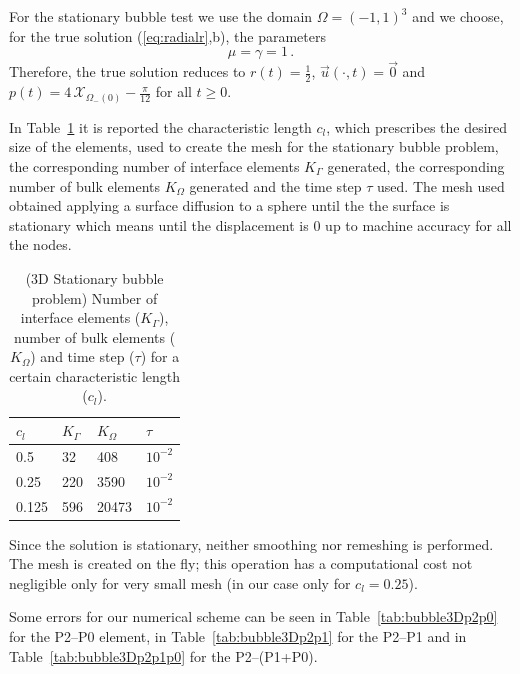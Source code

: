 \documentclass[a4paper,12pt,onecolumn]{article}
\newcommand{\bigchi}{\ensuremath{\mathrm{\mathcal{X}}}}
\newcommand{\charfcn}[1]{\bigchi_{#1}} %
\begin{document}
For the stationary bubble test we use the domain $\Omega = (-1,1)^3$ and we choose, for the true solution (\ref{eq:radialr},b), the parameters
\begin{equation*}
\mu = \gamma = 1\,. 
\end{equation*}
Therefore, the true solution reduces to $r(t) = \frac{1}{2}$, $\vec u(\cdot, t) = \vec 0$ and $p(t) = 4\,\charfcn{\Omega_-(0)} - \frac{\pi}{12}$ for all $t\geq0$.

In Table~\ref{tab:bubble3Delements} it is reported the characteristic length $c_l$, which prescribes the desired size of the elements, used to create the mesh for the stationary bubble problem, the corresponding number of interface elements $K_\Gamma$ generated, the corresponding number of bulk elements $K_\Omega$ generated and the time step $\tau$ used. The mesh used obtained applying a surface diffusion to a sphere until the the surface is stationary which means until the displacement is 0 up to machine accuracy for all the nodes.
\begin{table}
 \center
 \hspace*{-2cm}
\begin{tabular}{llll}
\hline
$c_l$ & $K_\Gamma$ & $K_\Omega$ & $\tau$ \\
\hline
0.5 & 32 & 408 & $10^{-2}$ \\
0.25 & 220 & 3590 & $10^{-2}$\\
0.125 & 596 & 20473 & $10^{-2}$\\
\hline
\end{tabular}
\hspace*{-2cm}
\caption{(3D Stationary bubble problem) Number of interface elements ($K_\Gamma$), number of bulk elements ($K_\Omega$) and time step ($\tau$) for a certain characteristic length ($c_l$).}
\label{tab:bubble3Delements}
\end{table}

Since the solution is stationary, neither smoothing nor remeshing is performed. The mesh is created on the fly; this operation has a computational cost not negligible only for very small mesh (in our case only for $c_l=0.25$). 

Some errors for our numerical scheme can be seen in Table~\ref{tab:bubble3Dp2p0} for the P2--P0 element, in Table~\ref{tab:bubble3Dp2p1} for the P2--P1 and in Table~\ref{tab:bubble3Dp2p1p0} for the P2--(P1+P0). 
\end{document}
